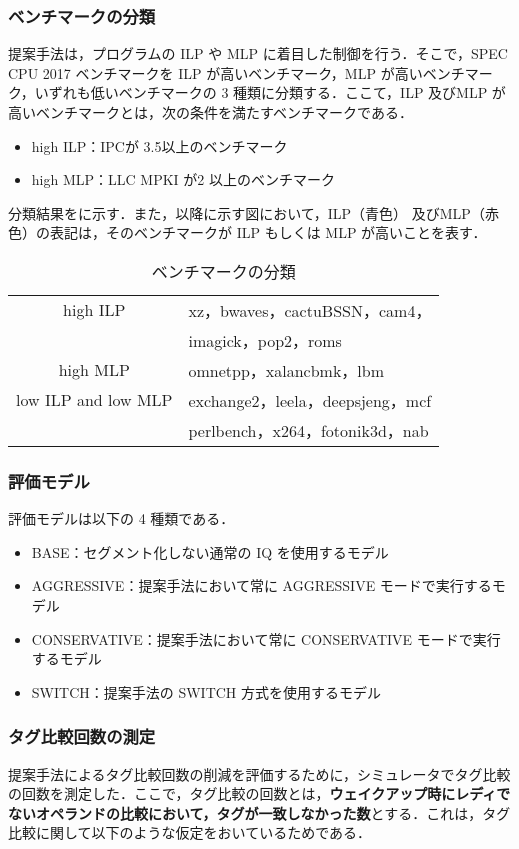 \subsubsection{ベンチマークの分類}
提案手法は，プログラムの ILP や MLP に着目した制御を行う．そこで，SPEC CPU 2017 ベンチマークを ILP が高いベンチマーク，MLP が高いベンチマーク，いずれも低いベンチマークの 3 種類に分類する．ここて，ILP 及びMLP が高いベンチマークとは，次の条件を満たすベンチマークである．
\begin{itemize}
  \item high ILP：IPCが 3.5以上のベンチマーク
  \item high MLP：LLC MPKI が2 以上のベンチマーク
\end{itemize}

分類結果をに示す．また，以降に示す図において，ILP（青色） 及びMLP（赤色）の表記は，そのベンチマークが ILP もしくは MLP が高いことを表す．
\begin{table}[htb]
  \caption{ベンチマークの分類}
  \footnotesize
  \center
    \begin{tabular}{c|l} \hline \hline
    high ILP & xz，bwaves，cactuBSSN，cam4，\\
             & imagick，pop2，roms\\ \hline
    high MLP &  omnetpp，xalancbmk，lbm\\ \hline
    low ILP and low MLP & exchange2，leela，deepsjeng，mcf\\
                        & perlbench，x264，fotonik3d，nab \\ \hline
  \end{tabular}
  \label{tab:classification}
\end{table}

\subsubsection{評価モデル}
評価モデルは以下の 4 種類である．
\begin{itemize}
  \item BASE：セグメント化しない通常の IQ を使用するモデル
  \item AGGRESSIVE：提案手法において常に AGGRESSIVE モードで実行するモデル
  \item CONSERVATIVE：提案手法において常に CONSERVATIVE モードで実行するモデル
  \item SWITCH：提案手法の SWITCH 方式を使用するモデル 
\end{itemize}

\subsubsection{タグ比較回数の測定}
提案手法によるタグ比較回数の削減を評価するために，シミュレータでタグ比較の回数を測定した．ここで，タグ比較の回数とは，\textbf{ウェイクアップ時にレディでないオペランドの比較において，タグが一致しなかった数}とする．これは，タグ比較に関して以下のような仮定をおいているためである．

